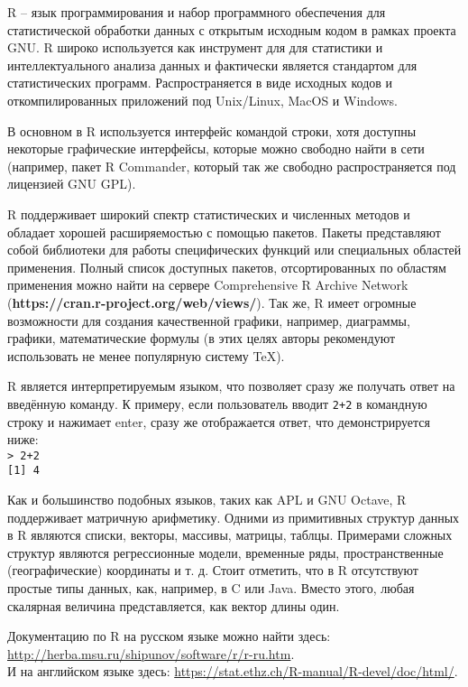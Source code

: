 
    R – язык программирования и набор программного обеспечения для статистической обработки 
    данных с открытым исходным кодом в рамках проекта GNU. R широко используется как 
    инструмент для для статистики и интеллектуального анализа данных и фактически является стандартом
    для статистических программ. Распространяется в виде исходных кодов и откомпилированных
    приложений под Unix/Linux, MacOS и Windows. 
    
    \indent В основном в R используется интерфейс командой строки, хотя доступны некоторые графические
    интерфейсы, которые можно свободно найти в сети (например, пакет R Commander, который так
    же свободно распространяется под лицензией GNU GPL).  
    
    \indent R поддерживает широкий спектр статистических и численных методов и обладает хорошей расширяемостью 
    с помощью пакетов. Пакеты представляют собой библиотеки для работы специфических функций или 
    специальных областей применения. Полный список доступных пакетов, отсортированных по областям 
    применения можно найти на сервере Comprehensive R Archive Network (\textbf{https://cran.r-project.org/web/views/}). Так же, R имеет огромные 
    возможности для создания качественной графики, например, диаграммы, графики, математические формулы 
    (в этих целях авторы рекомендуют использовать не менее популярную систему TeX). 
    
    \indent R является интерпретируемым языком, что позволяет сразу же получать ответ на введённую
    команду. К примеру, если пользователь вводит \texttt{2+2} в командную строку и нажимает enter, сразу же
    отображается ответ, что демонстрируется ниже: \\
    \indent \texttt{> 2+2} \\ 
    \indent \texttt{[1] 4} 
    
    \indent Как и большинство подобных языков, таких как APL и GNU Octave, R поддерживает матричную арифметику.
    Одними из примитивных структур данных в R являются списки, векторы, массивы, матрицы, таблцы.
    Примерами сложных структур являются регрессионные модели, временные ряды, пространственные 
    (географические) координаты и т. д. Стоит отметить, что в R отсутствуют простые типы данных, как,
    например, в C или Java. Вместо этого, любая скалярная величина представляется, как вектор длины один.  
    
    \indent Документацию по R на русском языке можно найти здесь: \url{http://herba.msu.ru/shipunov/software/r/r-ru.htm}. \\
    \indent И на английском языке здесь: \url{https://stat.ethz.ch/R-manual/R-devel/doc/html/}.
